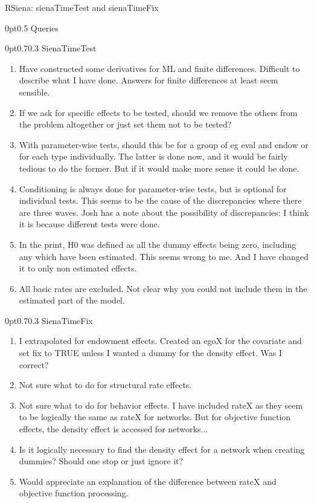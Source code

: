 \documentclass[12pt,a4paper]{article}
\makeatletter
\renewcommand{\=}{\,=\,}
\newcommand{\+}{\,+\,}
\renewcommand{\section}{\@startsection{section}{1}
                {0pt}{\baselineskip}{0.5\baselineskip}
                {\centering\sffamily} }
\renewcommand{\subsection}{\@startsection{subsection}{2}
                {0pt}{0.7\baselineskip}{0.3\baselineskip}
                {\sffamily} }
\makeatother
\begin{document}

\centerline{\huge{RSiena: sienaTimeTest and sienaTimeFix}}

\section{Queries}

\subsection{SienaTimeTest}
\begin{enumerate}
\item Have constructed some derivatives for ML and finite differences. Difficult
  to describe what I have done. Answers for finite differences at least seem
  sensible.
\item If we ask for specific effects to be tested, should we remove the others
  from the problem altogether or just set them not to be tested?
\item With parameter-wise tests, should this be for a group of eg eval and endow
  or for each type individually. The latter is done now, and it would be fairly
  tedious to do the former. But if it would make more sense it could be done.
\item Conditioning is always done for parameter-wise tests, but is optional for
  individual tests. This seems to be the cause of the discrepancies where there
  are three waves. Josh has a note about the possibility of discrepancies: I
  think it is because different tests were done.
\item In the print, H0 was defined as all the dummy effects being zero,
  including any which have been estimated. This seems wrong to me. And I have
  changed it to only non estimated effects.
\item All basic rates are excluded. Not clear why you could not include them in
  the estimated part of the model.
\end{enumerate}

\subsection{SienaTimeFix}

\begin{enumerate}
\item I extrapolated for endowment effects. Created an egoX for the covariate
  and set fix to TRUE unless I wanted a dummy for the density effect. Was I
  correct?
\item Not sure what to do for structural rate effects.
\item Not sure what to do for behavior effects. I have included rateX as they
  seem to be logically the same as rateX for networks. But for objective
  function effects, the density effect is accessed for networks...
\item Is it logically necessary to find the density effect for a network when
  creating dummies? Should one stop or just ignore it?
\item Would appreciate an explanation of the difference between rateX and
  objective function processing.
\end{enumerate}
\end{document}
